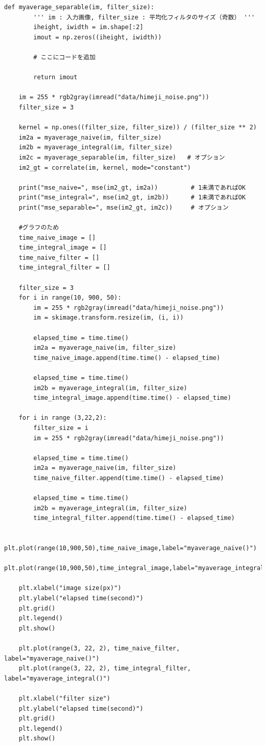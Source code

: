 \documentclass[12pt]{jarticle}
\begin{document}
\begin{lstlisting}[style = py,caption=kadai1]
    def myaverage_separable(im, filter_size):
        ''' im : 入力画像, filter_size : 平均化フィルタのサイズ（奇数） '''
        iheight, iwidth = im.shape[:2]
        imout = np.zeros((iheight, iwidth))
    
        # ここにコードを追加
       
        return imout
    
    im = 255 * rgb2gray(imread("data/himeji_noise.png"))
    filter_size = 3
    
    kernel = np.ones((filter_size, filter_size)) / (filter_size ** 2)
    im2a = myaverage_naive(im, filter_size)
    im2b = myaverage_integral(im, filter_size)
    im2c = myaverage_separable(im, filter_size)   # オプション
    im2_gt = correlate(im, kernel, mode="constant")
    
    print("mse_naive=", mse(im2_gt, im2a))         # 1未満であればOK
    print("mse_integral=", mse(im2_gt, im2b))      # 1未満であればOK
    print("mse_separable=", mse(im2_gt, im2c))     # オプション
    
    #グラフのため
    time_naive_image = []
    time_integral_image = []
    time_naive_filter = []
    time_integral_filter = []
    
    filter_size = 3
    for i in range(10, 900, 50):
        im = 255 * rgb2gray(imread("data/himeji_noise.png"))
        im = skimage.transform.resize(im, (i, i))
        
        elapsed_time = time.time()
        im2a = myaverage_naive(im, filter_size)
        time_naive_image.append(time.time() - elapsed_time)
        
        elapsed_time = time.time()
        im2b = myaverage_integral(im, filter_size)
        time_integral_image.append(time.time() - elapsed_time)
    
    for i in range (3,22,2):
        filter_size = i
        im = 255 * rgb2gray(imread("data/himeji_noise.png"))
        
        elapsed_time = time.time()
        im2a = myaverage_naive(im, filter_size)
        time_naive_filter.append(time.time() - elapsed_time)
        
        elapsed_time = time.time()
        im2b = myaverage_integral(im, filter_size)
        time_integral_filter.append(time.time() - elapsed_time)
        
    plt.plot(range(10,900,50),time_naive_image,label="myaverage_naive()")
    plt.plot(range(10,900,50),time_integral_image,label="myaverage_integral()")
    
    plt.xlabel("image size(px)")
    plt.ylabel("elapsed time(second)")
    plt.grid()
    plt.legend()
    plt.show()
    
    plt.plot(range(3, 22, 2), time_naive_filter, label="myaverage_naive()")
    plt.plot(range(3, 22, 2), time_integral_filter, label="myaverage_integral()")
    
    plt.xlabel("filter size")
    plt.ylabel("elapsed time(second)")
    plt.grid()
    plt.legend()
    plt.show()
\end{lstlisting}


\end{document}
